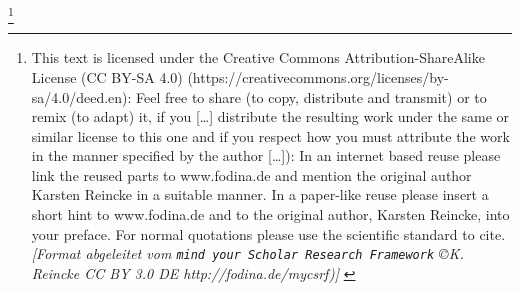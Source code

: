 %
%
%
%

\footnote{This text is licensed under the Creative
Commons Attribution-ShareAlike License (CC BY-SA 4.0)
(https://creativecommons.org/licenses/by-sa/4.0/deed.en): Feel free \glqq{}to share
(to copy, distribute and transmit)\grqq{} or \glqq{}to remix (to adapt)\grqq{}
it, if you \glqq{}[\ldots] distribute the resulting work under the same or
similar license to this one\grqq{} and if you respect how \glqq{}you must
attribute the work in the manner specified by the author [\ldots]\grqq{}):
\newline
In an internet based reuse please link the reused parts to www.fodina.de and
mention the original author Karsten Reincke in a suitable manner. In a
paper-like reuse please insert a short hint to www.fodina.de and to the original
author, Karsten Reincke, into your preface. For normal quotations please use the
scientific standard to cite.
\newline
{ \tiny \itshape [Format abgeleitet vom \texttt{mind your Scholar Research
Framework} \copyright K. Reincke CC BY 3.0 DE http://fodina.de/mycsrf)] }}
